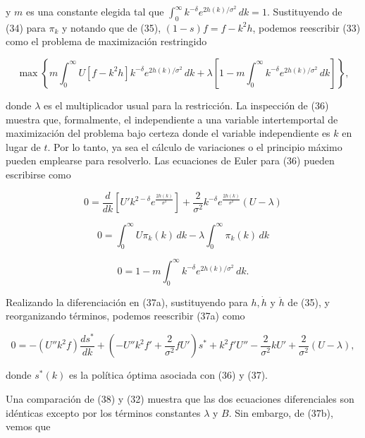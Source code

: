 \documentclass[a4paper,12pt]{article}
\begin{document}
y \( m \) es una constante elegida tal que \( \int_0^\infty k^{-\delta} e^{2h(k)/\sigma^2} \, dk = 1 \). Sustituyendo de (34) para \( \pi_k \) y notando que de (35), \( (1 - s) f = f - k^2 h \), podemos reescribir (33) como el problema de maximización restringido

		\begin{equation}
\max \left\{ m \int_0^\infty U[f - k^2 h] k^{-\delta} e^{2h(k)/\sigma^2} \, dk + \lambda \left[ 1 - m \int_0^\infty k^{-\delta} e^{2h(k)/\sigma^2} \, dk \right] \right\},
		\end{equation}

donde \( \lambda \) es el multiplicador usual para la restricción. La inspección de (36) muestra que, formalmente, el independiente a una variable intertemportal de maximización del problema bajo certeza donde el variable independiente es \( k \) en lugar de \( t \). Por lo tanto, ya sea el cálculo de variaciones o el principio máximo pueden emplearse para resolverlo. Las ecuaciones de Euler para (36) pueden escribirse como

		\begin{equation}
0 = \frac{d}{dk} \left[ U' k^{2 - \delta} e^{\frac{2h(k)}{\sigma^2}} \right] + \frac{2}{\sigma^2} k^{-\delta} e^{\frac{2h(k)}{\sigma^2}} (U - \lambda)
		\end{equation}

		\begin{equation}
0 = \int_0^\infty U \pi_k(k) \, dk - \lambda \int_0^\infty \pi_k(k) \, dk
		\end{equation}

		\begin{equation}
0 = 1 - m \int_0^\infty k^{-\delta} e^{2h(k)/\sigma^2} \, dk.
		\end{equation}

Realizando la diferenciación en (37a), sustituyendo para \( h, \dot{h} \) y \( \ddot{h} \) de (35), y reorganizando términos, podemos reescribir (37a) como

		\begin{equation}
0 = - (U'' k^2 f) \frac{d s^*}{dk} + (- U'' k^2 f' + \frac{2}{\sigma^2} f U') s^* + k^2 f' U'' - \frac{2}{\sigma^2} k U' + \frac{2}{\sigma^2} (U - \lambda),
		\end{equation}

donde \( s^*(k) \) es la política óptima asociada con (36) y (37).

Una comparación de (38) y (32) muestra que las dos ecuaciones diferenciales son idénticas excepto por los términos constantes \( \lambda \) y \( B \). Sin embargo, de (37b), vemos que
\end{document}
